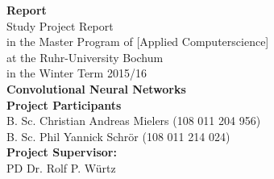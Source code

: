 \documentclass[11pt, a4paper]{article}
\begin{document}
\thispagestyle{empty}

\setlength{\hoffset}{-0.5cm} %

\lstset{
  basicstyle=\small,           %
  breaklines=true,             %
  captionpos=b,                %
  frame=single,                %
  keepspaces=true,             %
  numbers=right,               %
  showspaces=false,            %
  stepnumber=1,                %
  tabsize=4,                   %
  xleftmargin=0.14cm		   %
}


\begin{titlepage}
    \begin{center}
    \vphantom{0cm}
    \LARGE \textbf{Report}\\
    \vspace{3cm}
    \normalsize
    Study Project Report \\
    in the Master Program of \textcolor{AI-BLUE}{[Applied Computerscience]}\\
    at the Ruhr-University Bochum\\
    in the Winter Term 2015/16\\
    \vspace{4cm}
    \huge \textbf{Convolutional Neural Networks} \\
    \vspace{4cm}
    \normalsize
    \textbf{Project Participants}\\
    B. Sc. Christian Andreas Mielers (108 011 204 956)\\
    B. Sc. Phil Yannick Schrör (108 011 214 024)\\
    \vspace{2cm}
    \textbf{Project Supervisor:}\\
    PD Dr. Rolf P. Würtz
    \end{center}
\end{titlepage}

\newpage
{}
\setcounter{page}{2}

\tableofcontents
\end{document}
